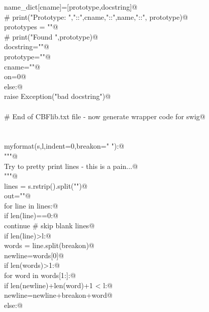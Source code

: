 \documentclass[10pt,a4paper,twoside,notitlepage]{article}
\begin{document}
\begin{flushleft}
\begin{list}{}{}
\mbox{}\verb@                name_dict[cname]=[prototype,docstring]@\\
\mbox{}\verb@                # print("Prototype: ","::",cname,"::",name,"::", prototype)@\\
\mbox{}\verb@            prototypes = ""@\\
\mbox{}\verb@            # print("Found ",prototype)@\\
\mbox{}\verb@            docstring="\n"@\\
\mbox{}\verb@            prototype=""@\\
\mbox{}\verb@            cname=""@\\
\mbox{}\verb@            on=0@\\
\mbox{}\verb@         else:@\\
\mbox{}\verb@            raise Exception("bad docstring")@\\
\mbox{}\verb@@\\
\mbox{}\verb@# End of CBFlib.txt file - now generate wrapper code for swig@\\
\mbox{}\verb@@\\
\mbox{}\verb@@\\
\mbox{}\verb@def myformat(s,l,indent=0,breakon=" "):@\\
\mbox{}\verb@   """@\\
\mbox{}\verb@   Try to pretty print lines - this is a pain...@\\
\mbox{}\verb@   """@\\
\mbox{}\verb@   lines = s.rstrip().split("\n")@\\
\mbox{}\verb@   out=""@\\
\mbox{}\verb@   for line in lines:@\\
\mbox{}\verb@      if len(line)==0:@\\
\mbox{}\verb@         continue # skip blank lines@\\
\mbox{}\verb@      if len(line)>l:@\\
\mbox{}\verb@         words = line.split(breakon)@\\
\mbox{}\verb@         newline=words[0]@\\
\mbox{}\verb@         if len(words)>1:@\\
\mbox{}\verb@            for word in words[1:]:@\\
\mbox{}\verb@               if len(newline)+len(word)+1 < l:@\\
\mbox{}\verb@                  newline=newline+breakon+word@\\
\mbox{}\verb@               else:@\\

\end{list}
\end{flushleft}
\end{document}
